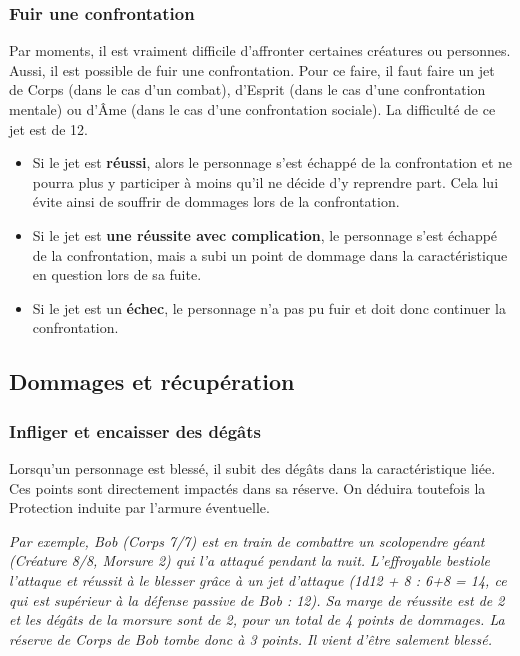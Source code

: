 \documentclass[twoside,12pt,english]{book}
\begin{document}
\subsubsection*{Fuir une confrontation}

Par moments, il est vraiment difficile d'affronter certaines créatures ou personnes. Aussi, il est possible de fuir une confrontation. Pour ce faire, il faut faire un jet de Corps (dans le cas d'un combat), d'Esprit (dans le cas d'une confrontation mentale) ou d'Âme (dans le cas d'une confrontation sociale). La difficulté de ce jet est de 12.

\begin{itemize}
\item Si le jet est \textbf{réussi}, alors le personnage s'est échappé de la confrontation et ne pourra plus y participer à moins qu'il ne décide d'y reprendre part. Cela lui évite ainsi de souffrir de dommages lors de la confrontation.
\item Si le jet est \textbf{une réussite avec complication}, le personnage s'est échappé de la confrontation, mais a subi un point de dommage dans la caractéristique en question lors de sa fuite.
\item Si le jet est un \textbf{échec}, le personnage n'a pas pu fuir et doit donc continuer la confrontation.
\end{itemize}

\subsection{Dommages et récupération}

\subsubsection*{Infliger et encaisser des dégâts}

Lorsqu'un personnage est blessé, il subit des dégâts dans la caractéristique liée. Ces points sont directement impactés dans sa réserve. On déduira toutefois la Protection induite par l'armure éventuelle.

\emph{Par exemple, Bob (Corps 7/7) est en train de combattre un scolopendre géant (Créature 8/8, Morsure 2) qui l'a attaqué pendant la nuit. L'effroyable bestiole l'attaque et réussit à le blesser grâce à un jet d'attaque (1d12 + 8 : 6+8 = 14, ce qui est supérieur à la défense passive de Bob : 12). Sa marge de réussite est de 2 et les dégâts de la morsure sont de 2, pour un total de 4 points de dommages. La réserve de Corps de Bob tombe donc à 3 points. Il vient d'être salement blessé.}
\end{document}
